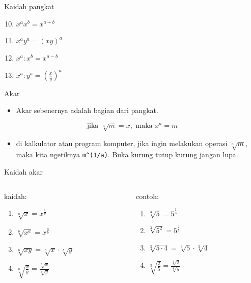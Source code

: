 \documentclass[
  ignorenonframetext,
]{beamer}
\providecommand{\tightlist}{%
  \setlength{\itemsep}{0pt}\setlength{\parskip}{0pt}}\usepackage{longtable,booktabs,array}
\begin{document}
\begin{frame}{Kaidah pangkat}
\label{kaidah-pangkat-1}
\begin{enumerate}
\setcounter{enumi}{9}
\item
  \(x^ax^b=x^{a+b}\)
\item
  \(x^ay^a=(xy)^a\)
\item
  \(x^a:x^b=x^{a-b}\)
\item
  \(x^a:y^a=(\frac{x}{y})^a\)
\end{enumerate}
\end{frame}

\begin{frame}[fragile]{Akar}
\label{akar}
\begin{itemize}
\tightlist
\item
  Akar sebenernya adalah bagian dari pangkat.
\end{itemize}

\[
\text {jika } \sqrt[a]{m}=x, \text{ maka } x^a=m
\]

\begin{itemize}
\tightlist
\item
  di kalkulator atau program komputer, jika ingin melakukan operasi
  \(\sqrt[a]{m}\), maka kita ngetiknya \texttt{m\^{}(1/a)}. Buka kurung
  tutup kurung jangan lupa.
\end{itemize}
\end{frame}

\begin{frame}{Kaidah akar}
\label{kaidah-akar}
\begin{columns}[T]
\begin{column}{0.47\textwidth}
kaidah:

\begin{enumerate}
\tightlist
\item
  \(\sqrt[b]{x}=x^{\frac{1}{b}}\)
\item
  \(\sqrt[b]{x^a}=x^{\frac{a}{b}}\)
\item
  \(\sqrt[b]{xy}=\sqrt[b]{x} \cdot \sqrt[b]{y}\)
\item
  \(\sqrt[b]{\frac{x}{y}}=\frac{\sqrt[b]{x}}{\sqrt[b]{y}}\)
\end{enumerate}
\end{column}

\begin{column}{0.47\textwidth}
contoh:

\begin{enumerate}
\tightlist
\item
  \(\sqrt[3]{5}=5^{\frac{1}{3}}\)
\item
  \(\sqrt[3]{5^2}=5^{\frac{2}{3}}\)
\item
  \(\sqrt[3]{5 \cdot 4}=\sqrt[3]{5} \cdot \sqrt[3]{4}\)
\item
  \(\sqrt[3]{\frac{2}{5}}=\frac{\sqrt[3]{2}}{\sqrt[3]{5}}\)
\end{enumerate}
\end{column}
\end{columns}
\end{frame}
\end{document}
